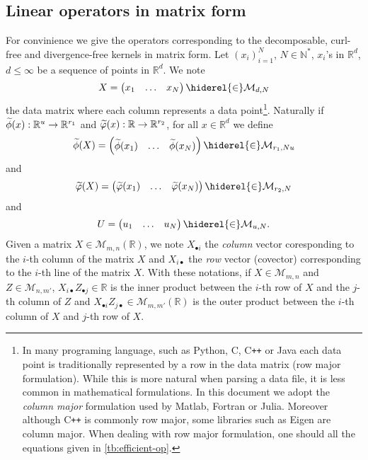 \subsection{Linear operators in matrix form}
For convinience we give the operators corresponding to the decomposable,
curl-free and divergence-free kernels in matrix form. Let $(x_i)_{i=1}^N$,
$N\in\mathbb{N}^*$, $x_i$'s in $\mathbb{R}^d$, $d\le\infty$ be a sequence of
points in $\mathbb{R}^d$. We note
\begin{dmath*}
    X=\begin{pmatrix}x_1 & \hdots &
    x_N\end{pmatrix}\hiderel{\in}\mathcal{M}_{d,N}
\end{dmath*}
the data matrix where each column represents a data point\footnote{In many
programing language, such as Python, C, C{}\verb!++! or Java each data point is
traditionally represented by a row in the data matrix (row major formulation).
While this is more natural when parsing a data file, it is less common in
mathematical formulations. In this document we adopt the \emph{column major}
formulation used by Matlab, Fortran or Julia. Moreover although C{}\verb!++! is
commonly row major, some libraries such as Eigen are column major. When dealing
with row major formulation, one should  all the equations given
in \cref{tb:efficient-op}.}. Naturally if
$\tildePhi{\omega}(x):\mathbb{R}^u\to\mathbb{R}^{r_1}$ and
$\widetilde{\varphi}(x):\mathbb{R}\to\mathbb{R}^{r_2}$, for all
$x\in\mathbb{R}^d$ we define
\begin{dmath*}
    \tildePhi{\omega}(X)=\begin{pmatrix}\tildePhi{\omega}(x_1) & \hdots &
    \tildePhi{\omega}(x_N)\end{pmatrix}\hiderel{\in}\mathcal{M}_{r_1,Nu}
\end{dmath*}
and
\begin{dmath*}
    \tildephi{\omega}(X)=\begin{pmatrix}\tildephi{\omega}(x_1) & \hdots &
    \tildephi{\omega}(x_N)\end{pmatrix}\hiderel{\in}\mathcal{M}_{r_2, N}
\end{dmath*}
and
\begin{dmath*}
    U=\begin{pmatrix} u_1 & \hdots&  u_N
    \end{pmatrix}\hiderel{\in}\mathcal{M}_{u, N}.
\end{dmath*}
Given a matrix $X\in\mathcal{M}_{m,n}(\mathbb{R})$, we note $X_{\bullet i}$ the
\emph{column} vector coresponding to the $i$-th column of the matrix $X$ and
$X_{i \bullet}$ the \emph{row} vector (covector) corresponding to the $i$-th
line of the matrix $X$. With these notations, if $X\in\mathcal{M}_{m,n}$ and
$Z\in\mathcal{M}_{n,m'}$, $X_{i\bullet}Z_{\bullet j}\in\mathbb{R}$ is the inner
product between the $i$-th row of $X$ and the $j$-th column of $Z$ and
$X_{\bullet i} Z_{j \bullet}\in\mathcal{M}_{m,m'}(\mathbb{R})$ is the outer
product between the $i$-th column of $X$ and $j$-th row of $X$.
